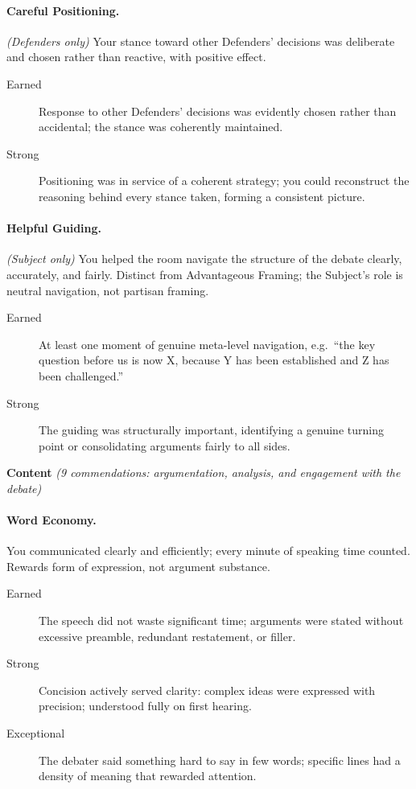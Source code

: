 \documentclass[12pt]{article}
\begin{document}
\paragraph{Careful Positioning.} \textit{(Defenders only)} Your stance toward other Defenders' decisions was deliberate and chosen rather than reactive, with positive effect.
\begin{description}
    \item[Earned] Response to other Defenders' decisions was evidently chosen rather than accidental; the stance was coherently maintained.
    \item[Strong] Positioning was in service of a coherent strategy; you could reconstruct the reasoning behind every stance taken, forming a consistent picture.
\end{description}

\paragraph{Helpful Guiding.} \textit{(Subject only)} You helped the room navigate the structure of the debate clearly, accurately, and fairly. Distinct from Advantageous Framing; the Subject's role is neutral navigation, not partisan framing.
\begin{description}
    \item[Earned] At least one moment of genuine meta-level navigation, e.g.\ ``the key question before us is now X, because Y has been established and Z has been challenged.''
    \item[Strong] The guiding was structurally important, identifying a genuine turning point or consolidating arguments fairly to all sides.
\end{description}

\medskip
\noindent\textbf{Content} \textit{(9 commendations: argumentation, analysis, and engagement with the debate)}

\paragraph{Word Economy.} You communicated clearly and efficiently; every minute of speaking time counted. Rewards form of expression, not argument substance.
\begin{description}
    \item[Earned] The speech did not waste significant time; arguments were stated without excessive preamble, redundant restatement, or filler.
    \item[Strong] Concision actively served clarity: complex ideas were expressed with precision; understood fully on first hearing.
    \item[Exceptional] The debater said something hard to say in few words; specific lines had a density of meaning that rewarded attention.
\end{description}
\end{document}
